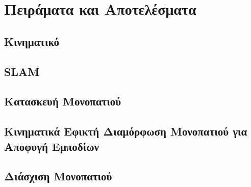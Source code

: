 
\chapter{Πειράματα και Αποτελέσματα} %

\label{Chapter5} %


\section{Κινηματικό}


\section{SLAM}


\section{Κατασκευή Μονοπατιού}


\section{Κινηματικά Εφικτή Διαμόρφωση Μονοπατιού για Αποφυγή Εμποδίων}


\section{Διάσχιση Μονοπατιού}


